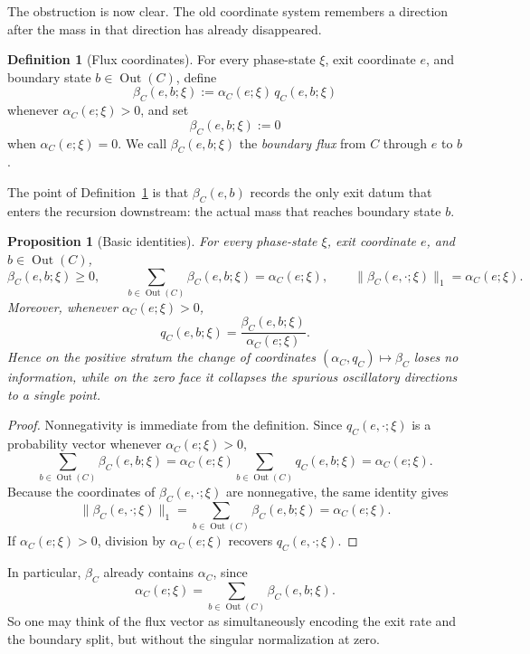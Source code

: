 \documentclass[12pt,a4paper]{article}
\newtheorem{proposition}[theorem]{Proposition}
\theoremstyle{definition}
\newtheorem{definition}[theorem]{Definition}
\DeclareMathOperator{\Out}{Out}
\begin{document}
The obstruction is now clear. The old coordinate system remembers a direction after the mass in that direction has already disappeared.

\begin{definition}[Flux coordinates]\label{def:flux-coordinates}
For every phase-state $\xi$, exit coordinate $e$, and boundary state $b\in \Out(C)$, define
\[
\beta_C(e,b;\xi):=
\alpha_C(e;\xi)\,q_C(e,b;\xi)
\]
whenever $\alpha_C(e;\xi)>0$, and set
\[
\beta_C(e,b;\xi):=0
\]
when $\alpha_C(e;\xi)=0$.
We call $\beta_C(e,b;\xi)$ the \emph{boundary flux} from $C$ through $e$ to $b$.
\end{definition}

The point of Definition~\ref{def:flux-coordinates} is that $\beta_C(e,b)$ records the only exit datum that enters the recursion downstream: the actual mass that reaches boundary state $b$.

\begin{proposition}[Basic identities]\label{prop:flux-identities}
For every phase-state $\xi$, exit coordinate $e$, and $b\in \Out(C)$,
\[
\beta_C(e,b;\xi)\ge 0,
\qquad
\sum_{b\in \Out(C)} \beta_C(e,b;\xi)=\alpha_C(e;\xi),
\qquad
\|\beta_C(e,\cdot;\xi)\|_1=\alpha_C(e;\xi).
\]
Moreover, whenever $\alpha_C(e;\xi)>0$,
\[
q_C(e,b;\xi)=\frac{\beta_C(e,b;\xi)}{\alpha_C(e;\xi)}.
\]
Hence on the positive stratum the change of coordinates $(\alpha_C,q_C)\mapsto \beta_C$ loses no information, while on the zero face it collapses the spurious oscillatory directions to a single point.
\end{proposition}

\begin{proof}
Nonnegativity is immediate from the definition. Since $q_C(e,\cdot;\xi)$ is a probability vector whenever $\alpha_C(e;\xi)>0$,
\[
\sum_{b\in \Out(C)} \beta_C(e,b;\xi)
=
\alpha_C(e;\xi)\sum_{b\in \Out(C)} q_C(e,b;\xi)
=
\alpha_C(e;\xi).
\]
Because the coordinates of $\beta_C(e,\cdot;\xi)$ are nonnegative, the same identity gives
\[
\|\beta_C(e,\cdot;\xi)\|_1
=
\sum_{b\in \Out(C)} \beta_C(e,b;\xi)
=
\alpha_C(e;\xi).
\]
If $\alpha_C(e;\xi)>0$, division by $\alpha_C(e;\xi)$ recovers $q_C(e,\cdot;\xi)$.
\end{proof}

In particular, $\beta_C$ already contains $\alpha_C$, since
\[
\alpha_C(e;\xi)=\sum_{b\in \Out(C)} \beta_C(e,b;\xi).
\]
So one may think of the flux vector as simultaneously encoding the exit rate and the boundary split, but without the singular normalization at zero.
\end{document}
